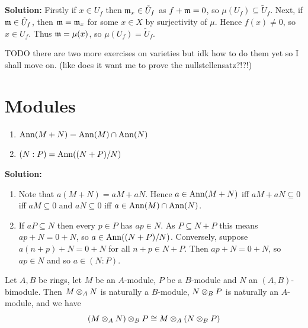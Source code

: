 \documentclass{article}
\begin{document}
\noindent\textbf{Solution:}
Firstly if \(x \in U_f\) then \(\mathfrak{m}_x \in \tilde{U}_f\) as \(f + \mathfrak{m} = 0\), so \(\mu(U_f) \subseteq \tilde{U}_f\).
Next, if \(\mathfrak{m} \in \tilde{U}_f\), then \(\mathfrak{m} = \mathfrak{m}_x\) for some \(x \in X\) by surjectivity of \(\mu\).
Hence \(f(x) \neq 0\), so \(x \in U_f\).
Thus \(\mathfrak{m} = \mu(x)\), so \(\mu(U_f) = \tilde{U}_f\).

\begin{exercise}
    TODO there are two more exercises on varieties but idk how to do them yet so I shall move on. (like does it want me to prove the nullstellensatz?!?!)
\end{exercise}

\section{Modules}
\renewcommand{\theexercise}{\thesection.\arabic{exercise}}

\setcounter{exercise}{1}
\begin{exercise}
    \begin{enumerate}
        \item \(\operatorname{Ann}(M + N) = \operatorname{Ann}(M) \cap \operatorname{Ann}(N)\)
        \item \((N : P) = \operatorname{Ann}((N + P)/N)\)
    \end{enumerate}
\end{exercise}

\noindent\textbf{Solution:}
\begin{enumerate}
    \item
        Note that \(a(M + N) = aM + aN\).
        Hence \(a \in \operatorname{Ann}(M + N)\) iff \(aM + aN \subseteq 0\) iff \(aM \subseteq 0\) and \(aN \subseteq 0\) iff \(a \in \operatorname{Ann}(M) \cap \operatorname{Ann}(N)\).
    \item
        If \(aP \subseteq N\) then every \(p \in P\) has \(ap \in N\).
        As \(P \subseteq N + P\) this means \(ap + N = 0 + N\), so \(a \in \operatorname{Ann}((N + P)/N)\).
        Conversely, suppose \(a(n + p) + N = 0 + N\) for all \(n + p \in N + P\).
        Then \(ap + N = 0 + N\), so \(ap \in N\) and so \(a \in (N : P)\).
\end{enumerate}

\setcounter{exercise}{15}
\begin{exercise} \label{ex2.16}
    Let \(A, B\) be rings, let \(M\) be an \(A\)-module, \(P\) be a \(B\)-module and \(N\) an \((A, B)\)-bimodule.
    Then \(M \otimes_A N\) is naturally a \(B\)-module, \(N \otimes_B P\) is naturally an \(A\)-module, and we have
    \[
        (M \otimes_A N) \otimes_B P \cong M \otimes_A (N \otimes_B P)
    \]
\end{exercise}
\end{document}
